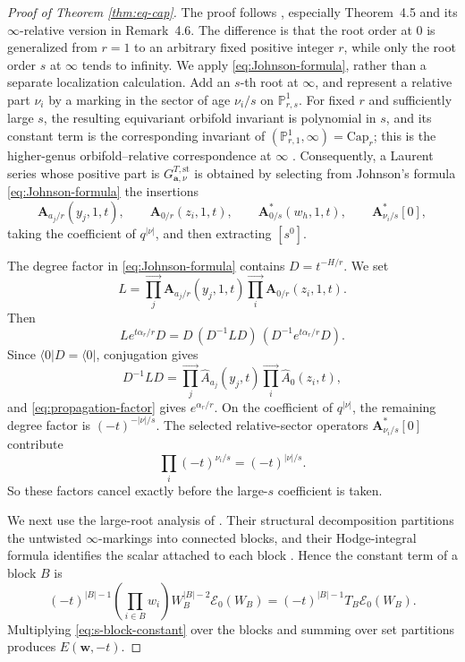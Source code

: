 \documentclass[letterpaper,12pt]{amsart}
\theoremstyle{definition}
\newcommand{\Ecal}{\mathcal E}
\newcommand{\PP}{\mathbb P}
\newcommand{\OrbCap}{\mathrm{Cap}}
\numberwithin{equation}{section}
\begin{document}
\begin{proof}[Proof of Theorem \ref{thm:eq-cap}]
The proof follows \cite[Section 4.2.1]{KW23}, especially Theorem~4.5 and its
$\infty$-relative version in Remark~4.6. The difference is that the root
order at $0$ is generalized from $r=1$ to an arbitrary fixed positive
integer $r$, while only the root order $s$ at $\infty$ tends to infinity.
We apply \eqref{eq:Johnson-formula}, rather than a separate localization
calculation.  Add an \(s\)-th root at \(\infty\), and represent a relative
part \(\nu_i\) by a marking in the sector of age \(\nu_i/s\) on
\(\PP^1_{r,s}\).  For fixed \(r\) and sufficiently large \(s\), the
resulting equivariant orbifold invariant is polynomial in \(s\), and its
constant term is the corresponding invariant of
\((\PP^1_{r,1},\infty)=\OrbCap_r\); this is the higher-genus
orbifold--relative correspondence at \(\infty\)
\cites{TY,FWY,FWY2}.  Consequently, a Laurent series whose positive
part is $G^{T,\mathrm{st}}_{\mathbf a,\nu}$ is obtained by selecting from Johnson's
formula \eqref{eq:Johnson-formula} the insertions
\[
 \boldsymbol A_{a_j/r}(y_j,1,t),\qquad
 \boldsymbol A_{0/r}(z_i,1,t),\qquad
 \boldsymbol A^*_{0/s}(w_h,1,t),\qquad
 \boldsymbol A^*_{\nu_i/s}[0],
\]
taking the coefficient of \(q^{|\nu|}\), and then extracting \([s^0]\).

The degree factor in
\eqref{eq:Johnson-formula} contains \(D=t^{-H/r}\). We set
\[
  L
  =
  \overrightarrow{\prod_j}\boldsymbol A_{a_j/r}(y_j,1,t)
  \overrightarrow{\prod_i}\boldsymbol A_{0/r}(z_i,1,t).
\]
Then
\[
 L e^{t\alpha_r/r}D
 =D\,(D^{-1}LD)\,(D^{-1}e^{t\alpha_r/r}D).
\]
Since $\langle0|D=\langle 0|$, conjugation gives
\[
  D^{-1}LD
  =
  \overrightarrow{\prod_j}\widehat A_{a_j}(y_j,t)
  \overrightarrow{\prod_i}\widehat A_0(z_i,t),
\]
and
\eqref{eq:propagation-factor} gives \(e^{\alpha_r/r}\). On the
coefficient of \(q^{|\nu|}\), the remaining degree factor is
\((-t)^{-|\nu|/s}\).  The selected relative-sector operators $\boldsymbol A^*_{\nu_i/s}[0]$ contribute
\[\prod_i(-t)^{\nu_i/s}=(-t)^{|\nu|/s}.\] 
So these factors cancel exactly
before the large-\(s\) coefficient is taken.

We next use the large-root analysis of \cite{KW23}.  Their structural
decomposition partitions the untwisted \(\infty\)-markings into connected
blocks, and their Hodge-integral formula identifies the scalar attached to
each block \cite[Lemmas 4.2 and 4.4]{KW23}. Hence the constant term of a block \(B\) is
\begin{equation}\label{eq:s-block-constant}
 (-t)^{|B|-1}
 \left(\prod_{i\in B}w_i\right)W_B^{|B|-2}\Ecal_0(W_B)
 =(-t)^{|B|-1}T_B\Ecal_0(W_B).
\end{equation}
Multiplying
\eqref{eq:s-block-constant} over the blocks and summing over set partitions
produces \(E(\mathbf w,-t)\).


\end{proof}
\end{document}
